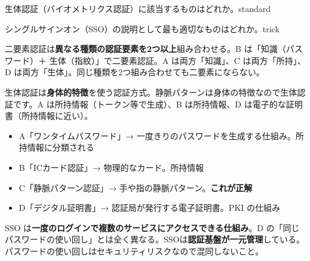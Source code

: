 \begin{mondai}{生体認証（バイオメトリクス認証）に該当するものはどれか。}{standard}
\end{mondai}

\begin{mondai}{シングルサインオン（SSO）の説明として最も適切なものはどれか。}{trick}
\end{mondai}

\kaitoupage


\begin{kaisetsu}
二要素認証は\textbf{異なる種類の認証要素を2つ以上}組み合わせる。B は「知識（パスワード）＋ 生体（指紋）」で二要素認証。A は両方「知識」、C は両方「所持」、D は両方「生体」。同じ種類を2つ組み合わせても二要素にならない。
\end{kaisetsu}


\begin{kaisetsu}
生体認証は\textbf{身体的特徴}を使う認証方式。静脈パターンは身体の特徴なので生体認証です。A は所持情報（トークン等で生成）、B は所持情報、D は電子的な証明書（所持情報に近い）。
\end{kaisetsu}

\begin{goutoubun}
\begin{itemize}
  \item A「ワンタイムパスワード」→ 一度きりのパスワードを生成する仕組み。所持情報に分類される
  \item B「ICカード認証」→ 物理的なカード。所持情報
  \item C「静脈パターン認証」→ 手や指の静脈パターン。\textbf{これが正解}
  \item D「デジタル証明書」→ 認証局が発行する電子証明書。PKI の仕組み
\end{itemize}
\end{goutoubun}


\begin{trickwarn}
SSO は\textbf{一度のログインで複数のサービスにアクセスできる仕組み}。D の「同じパスワードの使い回し」とは全く異なる。SSOは\textbf{認証基盤が一元管理}している。パスワードの使い回しはセキュリティリスクなので混同しないこと。
\end{trickwarn}

